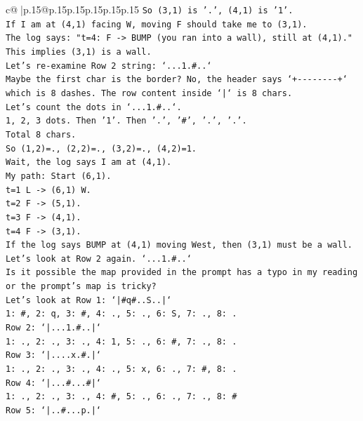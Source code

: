 \documentclass{article}
\begin{document}
{\begin{supertabular}{c@{$\;$}|p{.15\linewidth}@{}p{.15\linewidth}p{.15\linewidth}p{.15\linewidth}p{.15\linewidth}p{.15\linewidth}}
{{{\texttt{So (3,1) is '.', (4,1) is '1'.} \\
\texttt{If I am at (4,1) facing W, moving F should take me to (3,1).} \\
\texttt{The log says: "t=4: F {-}> BUMP (you ran into a wall), still at (4,1)."} \\
\texttt{This implies (3,1) is a wall.} \\
\texttt{Let's re{-}examine Row 2 string: `...1.\#..`} \\
\texttt{Maybe the first char is the border? No, the header says `+{-}{-}{-}{-}{-}{-}{-}{-}+` which is 8 dashes. The row content inside `|` is 8 chars.} \\
\texttt{Let's count the dots in `...1.\#..`.} \\
\texttt{1, 2, 3 dots. Then '1'. Then '.', '\#', '.', '.'.} \\
\texttt{Total 8 chars.} \\
\texttt{So (1,2)=., (2,2)=., (3,2)=., (4,2)=1.} \\
\texttt{Wait, the log says I am at (4,1).} \\
\texttt{My path: Start (6,1).} \\
\texttt{t=1 L {-}> (6,1) W.} \\
\texttt{t=2 F {-}> (5,1).} \\
\texttt{t=3 F {-}> (4,1).} \\
\texttt{t=4 F {-}> (3,1).} \\
\texttt{If the log says BUMP at (4,1) moving West, then (3,1) must be a wall.} \\
\texttt{Let's look at Row 2 again. `...1.\#..`} \\
\texttt{Is it possible the map provided in the prompt has a typo in my reading or the prompt's map is tricky?} \\
\texttt{Let's look at Row 1: `|\#q\#..S..|`} \\
\texttt{1: \#, 2: q, 3: \#, 4: ., 5: ., 6: S, 7: ., 8: .} \\
\texttt{Row 2: `|...1.\#..|`} \\
\texttt{1: ., 2: ., 3: ., 4: 1, 5: ., 6: \#, 7: ., 8: .} \\
\texttt{Row 3: `|....x.\#.|`} \\
\texttt{1: ., 2: ., 3: ., 4: ., 5: x, 6: ., 7: \#, 8: .} \\
\texttt{Row 4: `|...\#...\#|`} \\
\texttt{1: ., 2: ., 3: ., 4: \#, 5: ., 6: ., 7: ., 8: \#} \\
\texttt{Row 5: `|..\#...p.|`} \\
}}}
\end{supertabular}}
\end{document}
